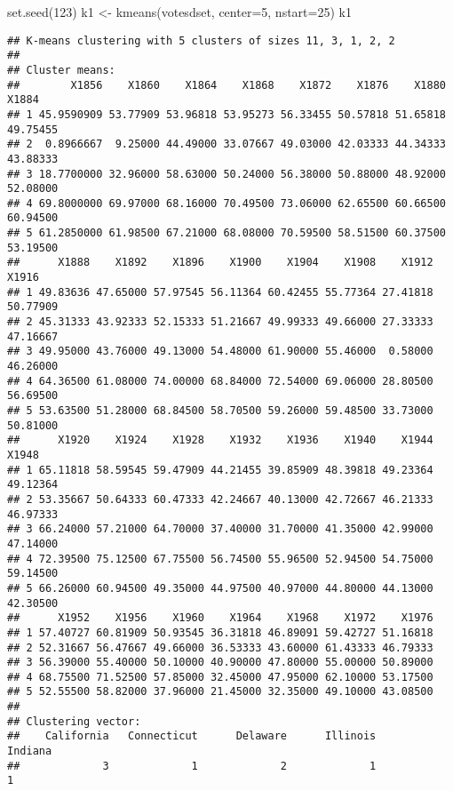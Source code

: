 \documentclass[
]{article}
\newenvironment{Shaded}{\begin{snugshade}}{\end{snugshade}}
\newcommand{\AttributeTok}[1]{\textcolor[rgb]{0.77,0.63,0.00}{#1}}
\newcommand{\DecValTok}[1]{\textcolor[rgb]{0.00,0.00,0.81}{#1}}
\newcommand{\FunctionTok}[1]{\textcolor[rgb]{0.00,0.00,0.00}{#1}}
\newcommand{\NormalTok}[1]{#1}
\newcommand{\OtherTok}[1]{\textcolor[rgb]{0.56,0.35,0.01}{#1}}
\begin{document}
\begin{Shaded}
\begin{Highlighting}[]
\FunctionTok{set.seed}\NormalTok{(}\DecValTok{123}\NormalTok{)}
\NormalTok{k1 }\OtherTok{\textless{}{-}} \FunctionTok{kmeans}\NormalTok{(votesdset, }\AttributeTok{center=}\DecValTok{5}\NormalTok{, }\AttributeTok{nstart=}\DecValTok{25}\NormalTok{)}
\NormalTok{k1}
\end{Highlighting}
\end{Shaded}

\begin{verbatim}
## K-means clustering with 5 clusters of sizes 11, 3, 1, 2, 2
## 
## Cluster means:
##        X1856    X1860    X1864    X1868    X1872    X1876    X1880    X1884
## 1 45.9590909 53.77909 53.96818 53.95273 56.33455 50.57818 51.65818 49.75455
## 2  0.8966667  9.25000 44.49000 33.07667 49.03000 42.03333 44.34333 43.88333
## 3 18.7700000 32.96000 58.63000 50.24000 56.38000 50.88000 48.92000 52.08000
## 4 69.8000000 69.97000 68.16000 70.49500 73.06000 62.65500 60.66500 60.94500
## 5 61.2850000 61.98500 67.21000 68.08000 70.59500 58.51500 60.37500 53.19500
##      X1888    X1892    X1896    X1900    X1904    X1908    X1912    X1916
## 1 49.83636 47.65000 57.97545 56.11364 60.42455 55.77364 27.41818 50.77909
## 2 45.31333 43.92333 52.15333 51.21667 49.99333 49.66000 27.33333 47.16667
## 3 49.95000 43.76000 49.13000 54.48000 61.90000 55.46000  0.58000 46.26000
## 4 64.36500 61.08000 74.00000 68.84000 72.54000 69.06000 28.80500 56.69500
## 5 53.63500 51.28000 68.84500 58.70500 59.26000 59.48500 33.73000 50.81000
##      X1920    X1924    X1928    X1932    X1936    X1940    X1944    X1948
## 1 65.11818 58.59545 59.47909 44.21455 39.85909 48.39818 49.23364 49.12364
## 2 53.35667 50.64333 60.47333 42.24667 40.13000 42.72667 46.21333 46.97333
## 3 66.24000 57.21000 64.70000 37.40000 31.70000 41.35000 42.99000 47.14000
## 4 72.39500 75.12500 67.75500 56.74500 55.96500 52.94500 54.75000 59.14500
## 5 66.26000 60.94500 49.35000 44.97500 40.97000 44.80000 44.13000 42.30500
##      X1952    X1956    X1960    X1964    X1968    X1972    X1976
## 1 57.40727 60.81909 50.93545 36.31818 46.89091 59.42727 51.16818
## 2 52.31667 56.47667 49.66000 36.53333 43.60000 61.43333 46.79333
## 3 56.39000 55.40000 50.10000 40.90000 47.80000 55.00000 50.89000
## 4 68.75500 71.52500 57.85000 32.45000 47.95000 62.10000 53.17500
## 5 52.55500 58.82000 37.96000 21.45000 32.35000 49.10000 43.08500
## 
## Clustering vector:
##    California   Connecticut      Delaware      Illinois       Indiana 
##             3             1             2             1             1 

\end{verbatim}
\end{document}
